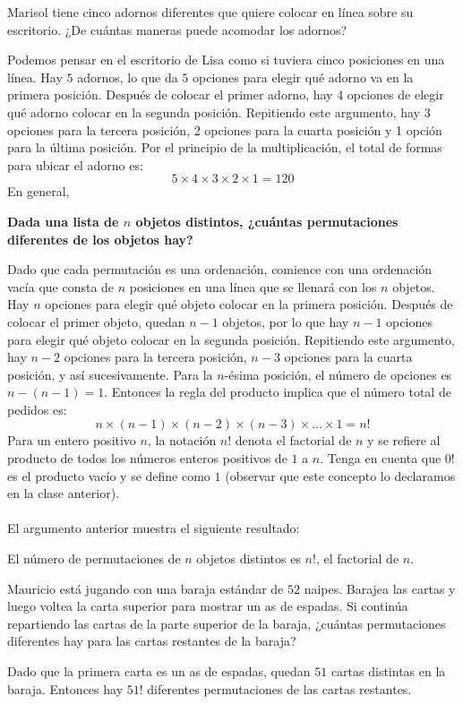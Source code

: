 \documentclass[12pt]{article}
\begin{document}
\begin{ejemplo}
Marisol tiene cinco adornos diferentes que quiere colocar en línea sobre su escritorio. ¿De cuántas maneras puede acomodar los adornos?
\end{ejemplo}
Podemos pensar en el escritorio de Lisa como si tuviera cinco posiciones en una línea. Hay $5$ adornos, lo que da $5$ opciones para elegir qué adorno va en la primera posición. Después de colocar el primer adorno, hay 4 opciones de elegir qué adorno colocar en la segunda posición. Repitiendo este argumento, hay 3 opciones para la tercera posición, 2 opciones para la cuarta posición y 1 opción para la última posición. Por el principio de la multiplicación, el total de formas para ubicar el adorno es:
\[5\times 4\times 3\times 2\times 1=120\]
En general,
\begin{center}
    \textbf{Dada una lista de $n$ objetos distintos, ¿cuántas permutaciones diferentes de los objetos hay?}
\end{center}
Dado que cada permutación es una ordenación, comience con una ordenación vacía que consta de $n$ posiciones en una línea que se llenará con los $n$ objetos. Hay $n$ opciones para elegir qué objeto colocar en la primera posición. Después de colocar el primer objeto, quedan $n-1$ objetos, por lo que hay $n-1$ opciones para elegir qué objeto colocar en la segunda posición. Repitiendo este argumento, hay $n-2$ opciones para la tercera posición, $n-3$ opciones para la cuarta posición, y así sucesivamente. Para la $n$-ésima posición, el número de opciones es $n-(n-1)= 1$. Entonces la regla del producto implica que el número total de pedidos es:
\[n\times (n-1)\times (n-2)\times(n-3)\times \ldots \times 1=n!\]
Para un entero positivo $n$, la notación $n!$ denota el factorial de $n$ y se refiere al producto de todos los números enteros positivos de $1$ a $n$. Tenga en cuenta que $0!$ es el producto vacío y se define como $1$ (observar que este concepto lo declaramos en la clase anterior).\\\\
El argumento anterior muestra el siguiente resultado:
\begin{teorema}
    El número de permutaciones de $n$ objetos distintos es $n!$, el factorial de $n$.
\end{teorema}
\begin{ejemplo}
Mauricio está jugando con una baraja estándar de $52$ naipes. Barajea las cartas y luego voltea la carta superior para mostrar un as de espadas. Si continúa repartiendo las cartas de la parte superior de la baraja, ¿cuántas permutaciones diferentes hay para las cartas restantes de la baraja?
\end{ejemplo}
\begin{solucion}
    Dado que la primera carta es un as de espadas, quedan $51$ cartas distintas en la baraja. Entonces hay $51!$ diferentes permutaciones de las cartas restantes.
\end{solucion}
\end{document}
